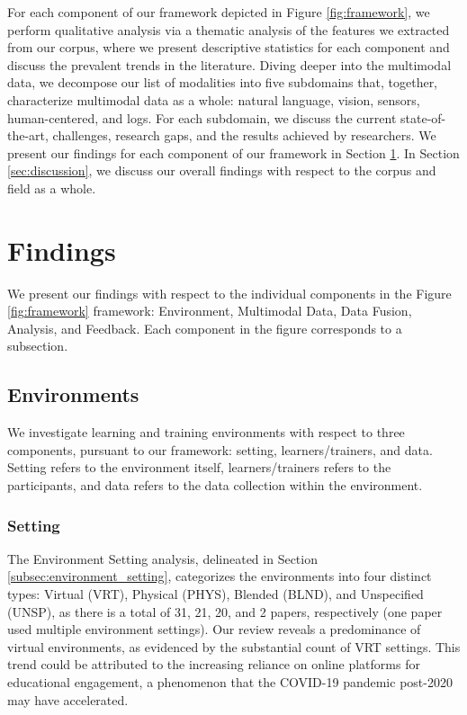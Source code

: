 \documentclass[manuscript,screen,review]{acmart}
\begin{document}
For each component of our framework depicted in Figure \ref{fig:framework}, we perform qualitative analysis via a thematic analysis of the features we extracted from our corpus, where we present descriptive statistics for each component and discuss the prevalent trends in the literature. Diving deeper into the multimodal data, we decompose our list of modalities into five subdomains that, together, characterize multimodal data as a whole: natural language, vision, sensors, human-centered, and logs. For each subdomain, we discuss the current state-of-the-art, challenges, research gaps, and the results achieved by researchers. We present our findings for each component of our framework in Section \ref{sec:findings}. In Section \ref{sec:discussion}, we discuss our overall findings with respect to the corpus and field as a whole.

\section{Findings}\label{sec:findings}
We present our findings with respect to the individual components in the Figure \ref{fig:framework} framework: Environment, Multimodal Data, Data Fusion, Analysis, and Feedback. Each component in the figure corresponds to a subsection. 

\subsection{Environments}
We investigate learning and training environments with respect to three components, pursuant to our framework: setting, learners/trainers, and data. Setting refers to the environment itself, learners/trainers refers to the participants, and data refers to the data collection within the environment.

\subsubsection{Setting}


The Environment Setting analysis, delineated in Section \ref{subsec:environment_setting}, categorizes the environments into four distinct types: Virtual (VRT), Physical (PHYS), Blended (BLND), and Unspecified (UNSP), as there is a total of 31, 21, 20, and 2 papers, respectively (one paper \cite{3637456466} used multiple environment settings). Our review reveals a predominance of virtual environments, as evidenced by the substantial count of VRT settings. This trend could be attributed to the increasing reliance on online platforms for educational engagement, a phenomenon that the COVID-19 pandemic post-2020 may have accelerated.
\end{document}
